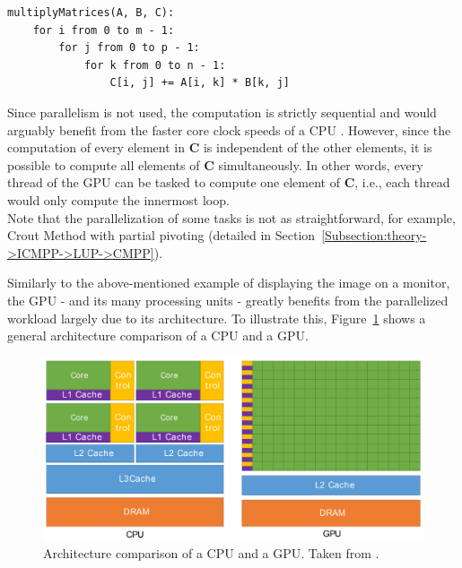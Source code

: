 \begin{lstlisting}[caption={Pseudocode for the multiplication of two matrices.
Let $\mathbf{A}$ be a $m\times n$ matrix, $\mathbf{B}$ a $n\times p$ matrix, and $\mathbf{C}$ a $m\times p$ matrix.},label={Listing:theory->GPUs->GPGPUs->multiplication-of-matrices}]
multiplyMatrices(A, B, C):
	for i from 0 to m - 1:
		for j from 0 to p - 1:
			for k from 0 to n - 1:
				C[i, j] += A[i, k] * B[k, j]
\end{lstlisting}

Since parallelism is not used, the computation is strictly sequential and would arguably benefit from the faster core clock speeds of a CPU \cite{Cejka2022}.
However, since the computation of every element in $\mathbf{C}$ is independent of the other elements, it is possible to compute all elements of $\mathbf{C}$ simultaneously.
In other words, every thread of the GPU can be tasked to compute one element of $\mathbf{C}$, i.e., each thread would only compute the innermost loop.\\
Note that the parallelization of some tasks is not as straightforward, for example, Crout Method with partial pivoting (detailed in Section~\ref{Subsection:theory->ICMPP->LUP->CMPP}).

Similarly to the above-mentioned example of displaying the image on a monitor, the GPU - and its many processing units - greatly benefits from the parallelized workload largely due to its architecture.
To illustrate this, Figure~\ref{Figure:theory->GPUs->GPGPU->CPU-nvidia-GPU-architecture-comparison} shows a general architecture comparison of a CPU and a GPU.

\begin{figure}[ht!]
	\centering
	\includegraphics[width=14cm, keepaspectratio]{images/ch01/nvidia_CPU_GPU_comparison.png}
	\caption{Architecture comparison of a CPU and a GPU.
		Taken from  \cite{NVIDIADecember2022}.
	}
	\label{Figure:theory->GPUs->GPGPU->CPU-nvidia-GPU-architecture-comparison}
\end{figure}


